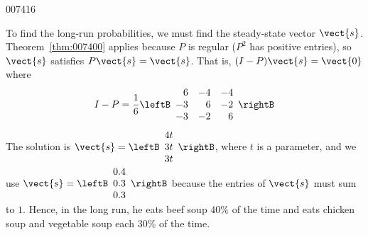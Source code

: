 \begin{example}{}{007416}
\begin{solution}
\hspace*{0.5em} To find the long-run probabilities, we must find the steady-state vector $\vect{s}$. Theorem~\ref{thm:007400} applies because $P$ is regular ($P^{2}$ has positive entries), so $\vect{s}$ satisfies $P\vect{s} = \vect{s}$. That is, $(I - P)\vect{s} = \vect{0}$ where
\begin{equation*}
I - P = \frac{1}{6} \leftB \begin{array}{rrr}
6 & -4 & -4 \\
-3 & 6 & -2 \\
-3 & -2 & 6
\end{array} \rightB
\end{equation*}
The solution is $\vect{s} = \leftB \begin{array}{r}
4t \\
3t \\
3t
\end{array} \rightB$,
 where $t$ is a parameter, and we use $\vect{s} = \leftB \begin{array}{r}
 0.4 \\
 0.3 \\
 0.3
 \end{array} \rightB$
 because the entries of $\vect{s}$ must sum to $1$. Hence, in the long run, he eats beef soup $40\%$ of the time and eats chicken soup and vegetable soup each $30\%$ of the time.
\end{solution}
\end{example}
